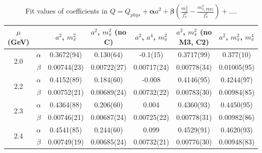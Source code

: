 \documentclass[12pt]{extarticle}
\begin{document}
\begin{table}[h!]
\begin{center}
\begin{tabular}{|c c|c|c|c|c|c|}
\hline
$\mu$ (GeV) &  & $a^2$, $m_\pi^2$& $a^2$, $m_\pi^2$ (no C)& $a^2$, $a^4$, $m_\pi^2$& $a^2$, $m_\pi^2$ (no M3, C2)& $a^2$, $m_\pi^2$, $m_\pi^4$\\
\hline
\multirow{2}{0.5in}{2.0} & $\alpha$ & 0.3672(94)& 0.130(64)& -0.1(15)& 0.3717(99)& 0.377(10)\\
 & $\beta$ & 0.00744(23)& 0.00722(27)& 0.00717(24)& 0.00778(34)& 0.01005(95)\\
\hline
\multirow{2}{0.5in}{2.2} & $\alpha$ & 0.4152(89)& 0.184(60)& -0.008& 0.4146(95)& 0.4244(97)\\
 & $\beta$ & 0.00752(21)& 0.00689(24)& 0.00732(22)& 0.00783(30)& 0.00984(85)\\
\hline
\multirow{2}{0.5in}{2.3} & $\alpha$ & 0.4364(88)& 0.206(60)& 0.004& 0.4360(93)& 0.4450(95)\\
 & $\beta$ & 0.00746(21)& 0.00687(24)& 0.00725(22)& 0.00778(31)& 0.00982(86)\\
\hline
\multirow{2}{0.5in}{2.4} & $\alpha$ & 0.4541(85)& 0.244(60)& 0.099& 0.4529(91)& 0.4620(93)\\
 & $\beta$ & 0.00749(19)& 0.00685(24)& 0.00732(21)& 0.00776(30)& 0.00948(83)\\
\hline
\end{tabular}
\caption{Fit values of coefficients in $Q = Q_{phys} + \mathbf{\alpha} a^2 + \mathbf{\beta}\left(\frac{m_\pi^2}{f_\pi^2}-\frac{m_{\pi,PDG}^2}{f_\pi^2}\right) + \ldots$.}
\end{center}
\end{table}




















\clearpage
\end{document}
